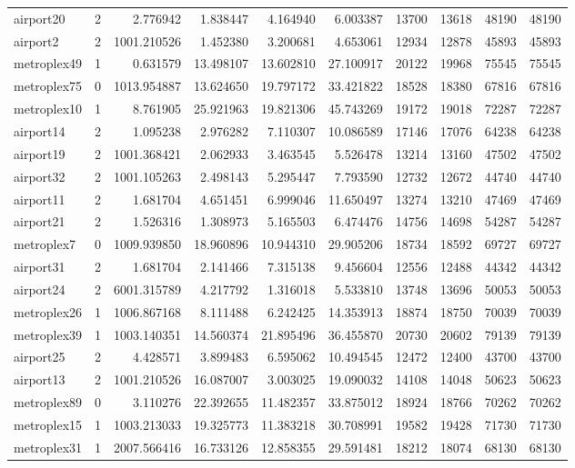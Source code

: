 \begin{longtable}{|l|r|r|r|r|r|r|r|r|r|}
airport20 & 2 & 2.776942 & 1.838447 & 4.164940 & 6.003387 & 13700 & 13618 & 48190 & 48190 \\
airport2 & 2 & 1001.210526 & 1.452380 & 3.200681 & 4.653061 & 12934 & 12878 & 45893 & 45893 \\
metroplex49 & 1 & 0.631579 & 13.498107 & 13.602810 & 27.100917 & 20122 & 19968 & 75545 & 75545 \\
metroplex75 & 0 & 1013.954887 & 13.624650 & 19.797172 & 33.421822 & 18528 & 18380 & 67816 & 67816 \\
metroplex10 & 1 & 8.761905 & 25.921963 & 19.821306 & 45.743269 & 19172 & 19018 & 72287 & 72287 \\
airport14 & 2 & 1.095238 & 2.976282 & 7.110307 & 10.086589 & 17146 & 17076 & 64238 & 64238 \\
airport19 & 2 & 1001.368421 & 2.062933 & 3.463545 & 5.526478 & 13214 & 13160 & 47502 & 47502 \\
airport32 & 2 & 1001.105263 & 2.498143 & 5.295447 & 7.793590 & 12732 & 12672 & 44740 & 44740 \\
airport11 & 2 & 1.681704 & 4.651451 & 6.999046 & 11.650497 & 13274 & 13210 & 47469 & 47469 \\
airport21 & 2 & 1.526316 & 1.308973 & 5.165503 & 6.474476 & 14756 & 14698 & 54287 & 54287 \\
metroplex7 & 0 & 1009.939850 & 18.960896 & 10.944310 & 29.905206 & 18734 & 18592 & 69727 & 69727 \\
airport31 & 2 & 1.681704 & 2.141466 & 7.315138 & 9.456604 & 12556 & 12488 & 44342 & 44342 \\
airport24 & 2 & 6001.315789 & 4.217792 & 1.316018 & 5.533810 & 13748 & 13696 & 50053 & 50053 \\
metroplex26 & 1 & 1006.867168 & 8.111488 & 6.242425 & 14.353913 & 18874 & 18750 & 70039 & 70039 \\
metroplex39 & 1 & 1003.140351 & 14.560374 & 21.895496 & 36.455870 & 20730 & 20602 & 79139 & 79139 \\
airport25 & 2 & 4.428571 & 3.899483 & 6.595062 & 10.494545 & 12472 & 12400 & 43700 & 43700 \\
airport13 & 2 & 1001.210526 & 16.087007 & 3.003025 & 19.090032 & 14108 & 14048 & 50623 & 50623 \\
metroplex89 & 0 & 3.110276 & 22.392655 & 11.482357 & 33.875012 & 18924 & 18766 & 70262 & 70262 \\
metroplex15 & 1 & 1003.213033 & 19.325773 & 11.383218 & 30.708991 & 19582 & 19428 & 71730 & 71730 \\
metroplex31 & 1 & 2007.566416 & 16.733126 & 12.858355 & 29.591481 & 18212 & 18074 & 68130 & 68130 \\

\end{longtable}
